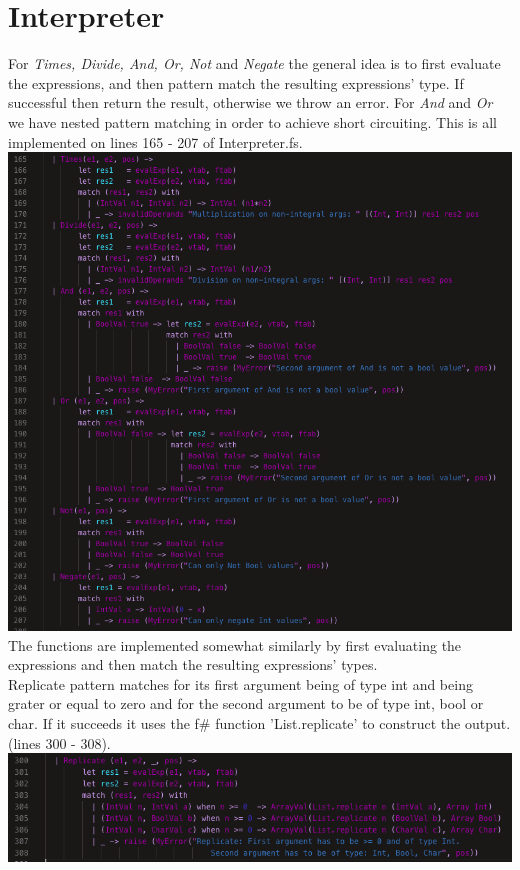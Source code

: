 \section{Interpreter}
For \textit{Times, Divide, And, Or, Not} and \textit{Negate} the general idea is to first evaluate the expressions, and then pattern match the resulting expressions' type. If successful then return the result, otherwise we throw an error. For \textit{And} and \textit{Or} we have nested pattern matching in order to achieve short circuiting. This is all implemented on lines 165 - 207 of Interpreter.fs.\\
\includegraphics[width=\linewidth]{Materials/Interpreter/Expressions}\\
The functions are implemented somewhat similarly by first evaluating the expressions and then match the resulting expressions' types.\\
Replicate pattern matches for its first argument being of type int and being grater or equal to zero and for the second argument to be of type int, bool or char. If it succeeds it uses the f\# function 'List.replicate' to construct the output. (lines 300 - 308).\\
\includegraphics[width=\linewidth]{Materials/Interpreter/Replicate}\\
